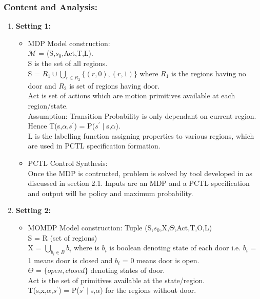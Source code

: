 \documentclass{article}
\theoremstyle{definition}
\begin{document}
\subsubsection{Content and Analysis:}
\begin{enumerate}
    \item \textbf{Setting 1:}
    \begin{itemize}
        \item MDP Model construction: \\
        $\mathcal{M}$ = (S,$s_0$,Act,T,L).\\
        S is the set of all regions.\\
        S = $R_1\cup \bigcup_{r\in R_2} \{(r,0),(r,1)\}$ where $R_1$ is the regions having no door and $R_2$ is set of regions having door.\\
        Act is set of actions which are motion primitives available at each region/state.\\
        Assumption: Transition Probability is only dependant on current region.\\
        Hence T(s,$\alpha$,$s^{'}$) = P($s^{'}\mid$s,$\alpha$).\\
        L is the labelling function assigning properties to various regions, which are used in PCTL specification formation.
        \item PCTL Control Synthesis:\\
        Once the MDP is contructed, problem is solved by tool developed in \cite{jatin1} as discussed in section 2.1. Inputs are an MDP and a PCTL specification and output will be policy and maximum probability.
    \end{itemize}
    \item \textbf{Setting 2:}
    \begin{itemize}
        \item MOMDP Model construction:
        Tuple (S,$s_0$,X,$\Theta$,Act,T,O,L)\\
        S = R (set of regions)\\
        X = $\bigcup_{b_i\in B} b_i$ where is $b_i$ is boolean denoting state of each door i.e. $b_i$ = 1 means door is closed and $b_i$ = 0 means door is open.\\
        $\Theta$ = $\{ open, closed \}$ denoting states of door.\\
        Act is the set of primitives available at the state/region.\\
        T(s,x,$\alpha$,$s^{'}$) = P($s^{'}\mid$s,$\alpha$) for the regions without door.\\

\end{itemize}
\end{enumerate}
\end{document}
